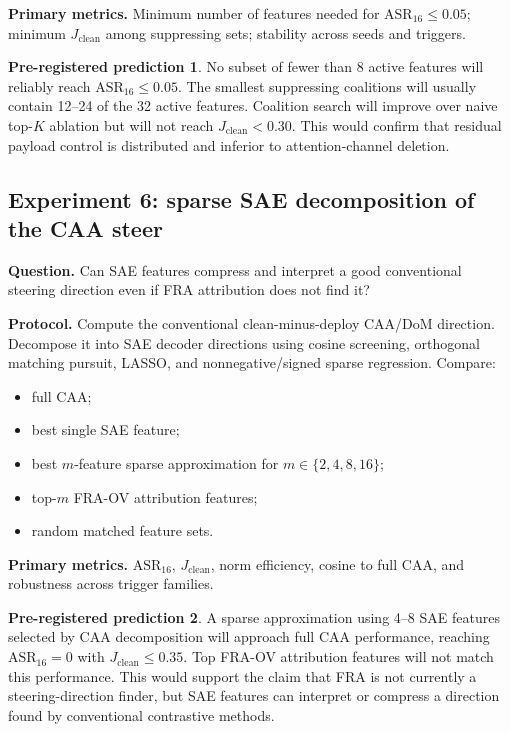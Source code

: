 \documentclass[11pt]{article}
\newcommand{\ASR}{\mathrm{ASR}_{16}}
\newcommand{\Jclean}{J_{\mathrm{clean}}}
\theoremstyle{definition}
\newtheorem{prediction}{Pre-registered prediction}
\theoremstyle{plain}
\theoremstyle{remark}
\begin{document}
\textbf{Primary metrics.} Minimum number of features needed for $\ASR\le 0.05$;
minimum $\Jclean$ among suppressing sets; stability across seeds and triggers.

\begin{prediction}
No subset of fewer than 8 active features will reliably reach $\ASR\le 0.05$.
The smallest suppressing coalitions will usually contain 12--24 of the 32 active
features.  Coalition search will improve over naive top-$K$ ablation but will not
reach $\Jclean<0.30$.  This would confirm that residual payload control is distributed
and inferior to attention-channel deletion.
\end{prediction}

\subsection{Experiment 6: sparse SAE decomposition of the CAA steer}

\textbf{Question.} Can SAE features compress and interpret a good conventional
steering direction even if FRA attribution does not find it?

\textbf{Protocol.}
Compute the conventional clean-minus-deploy CAA/DoM direction.  Decompose it into
SAE decoder directions using cosine screening, orthogonal matching pursuit, LASSO,
and nonnegative/signed sparse regression.  Compare:
\begin{itemize}
    \item full CAA;
    \item best single SAE feature;
    \item best $m$-feature sparse approximation for $m\in\{2,4,8,16\}$;
    \item top-$m$ FRA-OV attribution features;
    \item random matched feature sets.
\end{itemize}

\textbf{Primary metrics.} $\ASR$, $\Jclean$, norm efficiency, cosine to full CAA,
and robustness across trigger families.

\begin{prediction}
A sparse approximation using 4--8 SAE features selected by CAA decomposition will
approach full CAA performance, reaching $\ASR=0$ with $\Jclean\le 0.35$.  Top FRA-OV
attribution features will not match this performance.  This would support the claim
that FRA is not currently a steering-direction finder, but SAE features can interpret
or compress a direction found by conventional contrastive methods.
\end{prediction}
\end{document}
